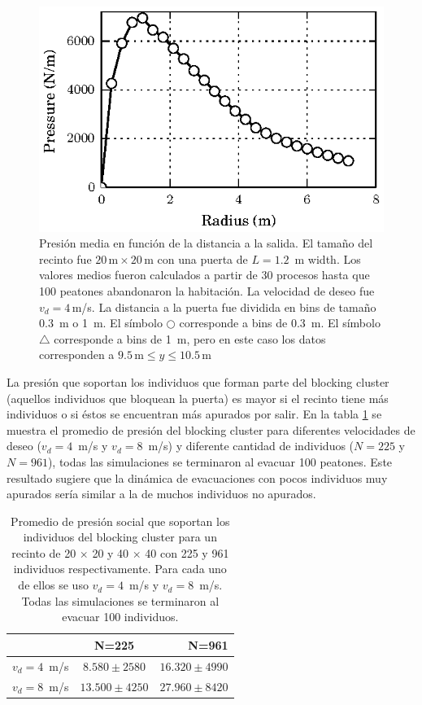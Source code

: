 \begin{figure}[H]
    \centering
    \includegraphics[scale=0.8]{figuras/p_dist.eps}
    \caption[width=5cm]{Presión media en función de la distancia a la salida. El tamaño del recinto fue $20\,\mathrm{m}\times20\,\mathrm{m}$  con una puerta de $L=1.2$~m width. Los valores medios fueron calculados a partir de 30 procesos hasta que 100 peatones abandonaron la habitación. La velocidad de deseo fue $v_d=4\,$m/s. La distancia a la puerta fue dividida en bins de tamaño $0.3$~m o 1~m.  El símbolo $\bigcirc$  corresponde a bins de $0.3$~m. El símbolo $\bigtriangleup$ corresponde a bins de 1~m, pero en este caso los datos corresponden a  $9.5\,\mathrm{m}\leq y\leq 10.5\,\mathrm{m}$ }
    \label{fis_g}
\end{figure}

La presión que soportan los individuos que forman parte del blocking cluster (aquellos individuos que bloquean la puerta) es mayor si el recinto tiene más individuos o si éstos se encuentran más apurados por salir. En la tabla \ref{tabla_p}  se muestra el promedio de presión del blocking cluster para diferentes velocidades de deseo ($v_d=4$~m/s y $v_d=8$~m/s) y diferente cantidad de individuos ($N=225$ y $N=961$), todas las simulaciones se terminaron al evacuar 100 peatones. Este resultado sugiere que la dinámica de evacuaciones con pocos individuos muy apurados sería similar a la de muchos individuos no apurados.

\begin{table}[H]
\begin{center}
   \begin{tabular}{| l | c | r | }
     \hline
      & N=225 & N=961 \\ \hline
     $v_d = 4$~m/s & $8.580 \pm 2580$   & $16.320 \pm 4990$ \\ \hline
     $v_d = 8$~m/s & $13.500 \pm 4250$  & $27.960 \pm 8420$  \\
     \hline
   \end{tabular}
 \end{center}
   \caption[width=5cm]{Promedio de presión social que soportan los individuos del blocking cluster para un recinto de 20 $\times$ 20 y 40 $\times$ 40 con 225 y 961 individuos respectivamente. Para cada uno de ellos se uso $v_d=4$~m/s y $v_d=8$~m/s. Todas las simulaciones se terminaron al evacuar 100 individuos.}
   \label{tabla_p}
   \end{table}   
   
